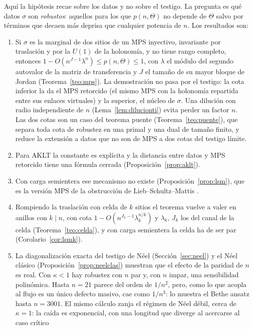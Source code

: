 \documentclass[11pt,a4paper]{article}
\theoremstyle{remark}
\begin{document}
Aquí la hipótesis recae sobre los datos y no sobre el testigo. La pregunta es qué datos $\sigma$ son \emph{robustos}: aquellos para los que $p(n,\Theta)$ no depende de
$\Theta$ salvo por términos que decaen más deprisa que cualquier potencia de $n$. Los resultados
son:
\begin{enumerate}
\item Si $\sigma$ es la marginal de dos sitios de un MPS inyectivo, invariante por traslación y por
  la $U(1)$ de la holonomía, y no tiene rango completo, entonces
  $1-O(n^{J-1}\lambda^n)\le p(n,\Theta)\le1$, con $\lambda$ el módulo del segundo autovalor de la
  matriz de transferencia y $J$ el tamaño de su mayor bloque de Jordan (Teorema~\ref{teo:mps}). La demostración no pasa por el testigo: la cota inferior la
  da el MPS retorcido (el mismo MPS con la holonomía repartida entre sus enlaces virtuales) y la
  superior, el núcleo de $\sigma$. Una dilución con radio independiente de $n$
  (Lema~\ref{lem:dilucionti}) evita perder un factor $n$. Las dos cotas son un caso del teorema
  puente (Teorema~\ref{teo:puente}), que separa toda cota de robustez en una primal y una dual de
  tamaño finito, y reduce la extensión a datos que no son de MPS a dos cotas del testigo límite.
\item Para AKLT la constante es explícita y la distancia entre datos y MPS retorcido tiene una
  fórmula cerrada (Proposición~\ref{prop:aklt}).
\item Con carga semientera ese mecanismo no existe (Proposición~\ref{prop:lsm}), que es la versión
  MPS de la obstrucción de Lieb--Schultz--Mattis \cite{lsm,affleck-lieb}.
\item Rompiendo la traslación con celda de $k$ sitios el teorema vuelve a valer en anillos con
  $k\mid n$, con cota $1-O(n^{J_k-1}\lambda_k^{n/k})$ y $\lambda_k$, $J_k$ los del canal de la
  celda (Teorema~\ref{teo:celda}), y con carga semientera la celda ha de ser par
  (Corolario~\ref{cor:lsmk}).
\item La diagonalización exacta del testigo de Néel (Sección~\ref{sec:neel}) y el Néel clásico
  (Proposición~\ref{prop:neelclas}) muestran que el efecto de la paridad de $n$ es real. Con $\kappa<1$ hay
  robustez con $n$ par y, con $n$ impar, una sensibilidad polinómica. Hasta $n=21$ parece del orden
  de $1/n^2$, pero, como lo que acopla al flujo es un único defecto masivo, cae como $1/n^3$: lo
  muestra el Bethe ansatz hasta $n=3001$. El mismo cálculo zanja el régimen de Néel débil, cerca de
  $\kappa=1$: la caída es exponencial, con una longitud que diverge al acercarse al caso crítico

\end{enumerate}
\end{document}
